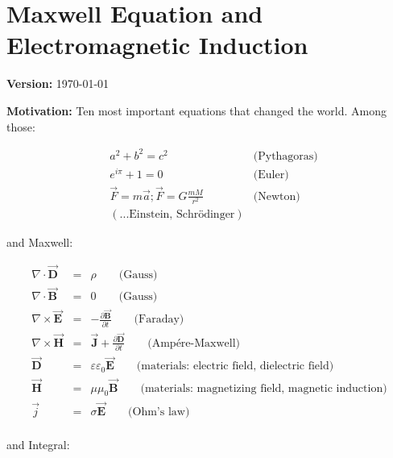 \documentclass[a4paper,12pt,fleqn]{article}
\begin{document}
 \section{Maxwell Equation and Electromagnetic Induction}
 \textbf{Version:} \today 

 \textbf{Motivation:} Ten most important equations that changed the world. Among those:

\begin{eqnarray*}
  &a^2+b^2 = c^2 & \text{(Pythagoras)}\\
  &e^{i\pi}+1=0 \quad &\text{(Euler)}\\
  &\vec{F} = m\vec{a}; \vec{F} = G\frac{mM}{r^2} & \text{(Newton)} \\
  &(... \text{Einstein, Schrödinger})
 \end{eqnarray*}
 
 and Maxwell:

 \begin{eqnarray*}
  \nabla \cdot \vec{\mathbf{D}}  &=& \rho \qquad  \text{(Gauss)}\\
  \nabla \cdot \vec{\mathbf{B}}  &=& 0 \qquad  \text{(Gauss)} \\
  \nabla \times \vec{\mathbf{E}} &=& -\frac{\partial \vec{\mathbf{B}}} {\partial t} \qquad \text{(Faraday)}\\
  \nabla \times \vec{\mathbf{H}} &=& \vec{\mathbf{J}} + \frac{\partial \vec{\mathbf{D}}} {\partial t} \qquad \text{(Amp\'{e}re-Maxwell)}\\
  \vec{\mathbf{D}} &=& \varepsilon \varepsilon_0\vec{\mathbf{E}} \qquad  \text{(materials: electric field, dielectric field)} \\
  \vec{\mathbf{H}} &=& \mu \mu_0\vec{\mathbf{B}}  \qquad \text{(materials: magnetizing field, magnetic induction)} \\
  \vec{j} &=& \sigma \vec{\mathbf{E}}  \qquad \text{(Ohm's law)} \\
 \end{eqnarray*}

 and Integral:
\end{document}
